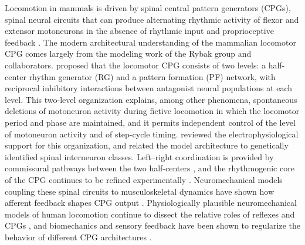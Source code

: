 Locomotion in mammals is driven by spinal central pattern generators (CPGs), spinal neural circuits that can produce alternating rhythmic activity of flexor and extensor motoneurons in the absence of rhythmic input and proprioceptive feedback \citep{brown_intrinsic_1911, rybak_modelling_2006}. The modern architectural understanding of the mammalian locomotor CPG comes largely from the modeling work of the Rybak group and collaborators. \citet{rybak_modelling_2006} proposed that the locomotor CPG consists of two levels: a half-center rhythm generator (RG) and a pattern formation (PF) network, with reciprocal inhibitory interactions between antagonist neural populations at each level. This two-level organization explains, among other phenomena, spontaneous deletions of motoneuron activity during fictive locomotion in which the locomotor period and phase are maintained, and it permits independent control of the level of motoneuron activity and of step-cycle timing. \citet{mccrea_organization_2008} reviewed the electrophysiological support for this organization, and \citet{rybak_organization_2015} related the model architecture to genetically identified spinal interneuron classes. Left--right coordination is provided by commissural pathways between the two half-centers \citep{molkov_mechanisms_2015, danner_central_2016}, and the rhythmogenic core of the CPG continues to be refined experimentally \citep{rancic_recent_2021}. Neuromechanical models coupling these spinal circuits to musculoskeletal dynamics have shown how afferent feedback shapes CPG output \citep{markin_afferent_2010, shevtsova_modeling_2016}. Physiologically plausible neuromechanical models of human locomotion continue to dissect the relative roles of reflexes and CPGs \citep{dirusso_investigating_2023}, and biomechanics and sensory feedback have been shown to regularize the behavior of different CPG architectures \citep{deng_biomechanical_2022}.

